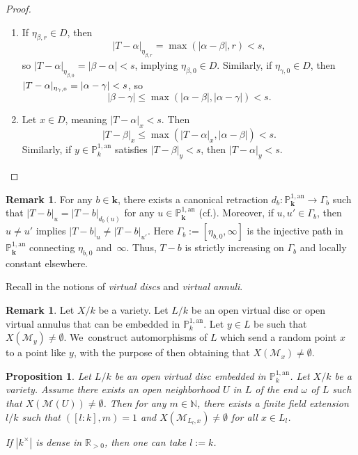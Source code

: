 \documentclass[10pt]{amsart}
\newcommand{\cf}{cf.}
\newcommand{\skpt}{\par\smallskip}
\newcommand{\bbk}{{\boldsymbol{k}}}%
\newtheorem{prop}[thm]{Proposition}
\theoremstyle{definition}
\newtheorem{rem}[thm]{Remark}
\begin{document}
\pagebreak[2]
\skpt
\begin{proof}
\begin{enumerate}
\item
If $\eta_{\beta, r} \in D$, then
\[
|T-\alpha|_{\eta_{\beta, r}}=\max(|\alpha-\beta|, r)<s,
\]
so ${|T-\alpha|_{\eta_{\beta, 0}}=|\beta-\alpha|<s}$, implying $\eta_{\beta, 0} \in D$.
Similarly, if $\eta_{\gamma,0} \in D$, then $|T-\nobreak\alpha|_{\eta_{\gamma, 0}}=|\alpha-\gamma|<s$, so
\[
|\beta-\gamma|\leqslant \max(|\alpha-\beta|, |\alpha-\gamma|)<s.
\]

\item
Let $x \in D$, meaning $|T-\alpha|_x <s$. Then
\[
|T-\beta|_x \leqslant \max(|T-\alpha|_x, |\alpha-\beta|) <s.
\]
Similarly, if $y \in \mathbb{P}_{k}^{1, \mathrm{an}}$
satisfies $|T-\beta|_y < s$, then $|T-\alpha|_y<s$.\qedhere
\end{enumerate}
\end{proof}

\begin{rem} \label{5.2.1}
For any $b \in \bbk$, there exists a canonical retraction ${d_b: \mathbb{P}_{\bbk}^{1, \mathrm{an}} \to \Gamma_b}$ such that $|T-b|_{u}=|T-b|_{d_b(u)}$ for any $u \in \mathbb{P}_{\bbk}^{1, \mathrm{an}}$ (\cf \cite[3.4.24]{duc}). Moreover, if $u, u' \in \Gamma_b$, then $u \neq u'$ implies $|T-b|_u \neq |T-b|_{u'}$. Here $\Gamma_b:=[\eta_{b,0}, \infty]$ is the injective path in $\mathbb{P}_{\bbk}^{1, \mathrm{an}}$ connecting $\eta_{b,0}$ and~$\infty$.
Thus, $T-b$ is strictly increasing on $\Gamma_b$ and locally constant elsewhere.
\end{rem}

Recall in \cite[p.\,210]{duc} the notions of \emph{virtual discs} and \emph{virtual annuli}.

\begin{rem} \label{intro}
Let $X/k$ be a variety. Let $L/k$ be an open virtual disc or open virtual annulus that can be embedded in $\mathbb{P}_k^{1, \mathrm{an}}$. Let $y \in L$ be such that $X(\mathscr{M}_y) \neq \emptyset$.
We~construct automorphisms of $L$ which send a random point $x$ to a point like $y$, with the purpose of then obtaining that $X(\mathscr{M}_{x}) \neq \emptyset$.
\end{rem}

\begin{prop} \label{5.1}
Let $L/k$ be an open virtual disc embedded in $\mathbb{P}_k^{1, \mathrm{an}}$. Let $X/k$ be a variety. Assume there exists an open neighborhood $U$ in $L$ of the end $\omega$ of $L$ such that $X(\mathscr{M}(U)) \neq \emptyset$. Then for any $m \in \mathbb{N}$, there exists a finite field extension $l/k$ such that $([l:k], m)=1$ and $X(\mathscr{M}_{L_l, x}) \neq \emptyset$ for all $x \in L_l$.

If $|k^{\times}|$ is dense in $\mathbb{R}_{>0}$, then one can take $l:=k$.
\end{prop}
\end{document}
